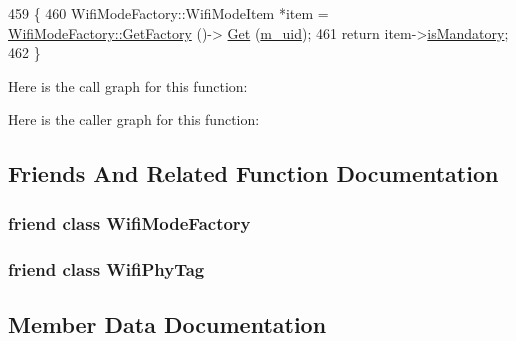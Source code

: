 \begin{DoxyCode}
459 \{
460   WifiModeFactory::WifiModeItem *item = \hyperlink{classns3_1_1WifiModeFactory_a9c6f695d733355dee8d74bd1709868fc}{WifiModeFactory::GetFactory} ()->
      \hyperlink{classns3_1_1WifiModeFactory_a3086868810ff4347e31c63027726f544}{Get} (\hyperlink{classns3_1_1WifiMode_ad63e4633ba59d019abfb07de0858727f}{m\_uid});
461   \textcolor{keywordflow}{return} item->\hyperlink{structns3_1_1WifiModeFactory_1_1WifiModeItem_a68457ddea74452573f50e568dfe2eb07}{isMandatory};
462 \}
\end{DoxyCode}


Here is the call graph for this function\+:




Here is the caller graph for this function\+:




\subsection{Friends And Related Function Documentation}
\subsubsection[{\texorpdfstring{Wifi\+Mode\+Factory}{WifiModeFactory}}]{\setlength{\rightskip}{0pt plus 5cm}friend class {\bf Wifi\+Mode\+Factory}\hspace{0.3cm}{\ttfamily [friend]}}\hypertarget{classns3_1_1WifiMode_a3dd10420883b97bc4c80c2e5a999c5e4}{}\label{classns3_1_1WifiMode_a3dd10420883b97bc4c80c2e5a999c5e4}
\subsubsection[{\texorpdfstring{Wifi\+Phy\+Tag}{WifiPhyTag}}]{\setlength{\rightskip}{0pt plus 5cm}friend class {\bf Wifi\+Phy\+Tag}\hspace{0.3cm}{\ttfamily [friend]}}\hypertarget{classns3_1_1WifiMode_ad524a1d0e1a9ae5b500765420c7b6b19}{}\label{classns3_1_1WifiMode_ad524a1d0e1a9ae5b500765420c7b6b19}


\subsection{Member Data Documentation}
